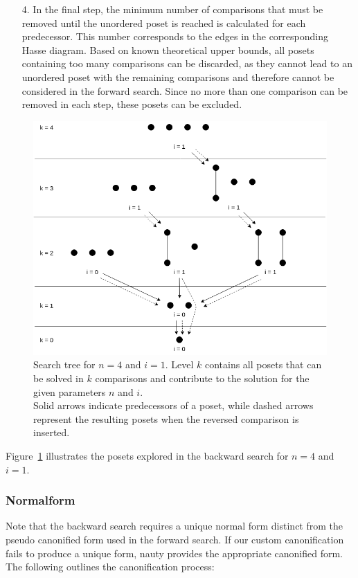 \documentclass[10pt,journal,compsoc]{IEEEtran}
\begin{document}
\begin{itemize}
  \item[4.]
    In the final step, the minimum number of comparisons that must be removed until the unordered poset is reached is calculated for each predecessor.
    This number corresponds to the edges in the corresponding Hasse diagram.
    Based on known theoretical upper bounds, all posets containing too many comparisons can be discarded, as they cannot lead to an unordered poset with the remaining comparisons and therefore cannot be considered in the forward search.
    Since no more than one comparison can be removed in each step, these posets can be excluded.
\end{itemize}

\begin{figure}[!b]
  \centering
  \includegraphics[width=\columnwidth]{figures/backward-search-tree.png}
  \caption{Search tree for $n = 4$ and $i = 1$.
    Level $k$ contains all posets that can be solved in $k$ comparisons and contribute to the solution for the given parameters $n$ and $i$. \\
    Solid arrows indicate predecessors of a poset, while dashed arrows represent the resulting posets when the reversed comparison is inserted.}
  \label{fig:backward-search-tree}
\end{figure}

Figure~\ref{fig:backward-search-tree} illustrates the posets explored in the backward search for $n = 4$ and $i = 1$.

\subsubsection{Normalform} \label{sec:backward:normal_form}
Note that the backward search requires a unique normal form distinct from the pseudo canonified form used in the forward search.
If our custom canonification fails to produce a unique form, nauty provides the appropriate canonified form.
The following outlines the canonification process:
\end{document}
